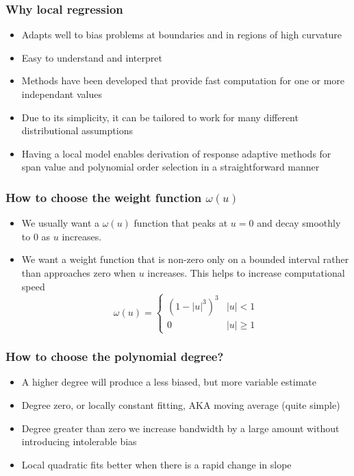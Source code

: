 \documentclass{article}
\begin{document}
\subsubsection{Why local regression}
\begin{itemize}
        \item Adapts well to bias problems at boundaries and in regions of high curvature
        \item Easy to understand and interpret
        \item Methods have been developed that provide fast computation for one or more independant values
        \item Due to its simplicity, it can be tailored to work for many different distributional assumptions
        \item Having a local model enables derivation of response adaptive methods for span value and polynomial order selection in a straightforward manner
\end{itemize}

\subsubsection{How to choose the weight function $\omega(u)$}
\begin{itemize}
    \item We usually want a $\omega(u)$ function that peaks at $u = 0$ and decay smoothly to 0 as $u$ increases.
    \item We want a weight function that is non-zero only on a bounded interval rather than approaches zero when $u$ increases. This helps to increase computational speed
    \begin{equation*}
        \omega(u) = \begin{cases}
            (1 - |u|^3)^3 & |u| < 1\\
            0 & |u| \geq 1
        \end{cases}
    \end{equation*}
\end{itemize}


\subsubsection{How to choose the polynomial degree?}
\begin{itemize}
    \item A higher degree will produce a less biased, but more variable estimate
    \item Degree zero, or locally constant fitting, AKA moving average (quite simple)
    \item Degree greater than zero we increase bandwidth by a large amount without introducing intolerable bias
    \item Local quadratic fits better when there is a rapid change in slope
\end{itemize}
\end{document}
